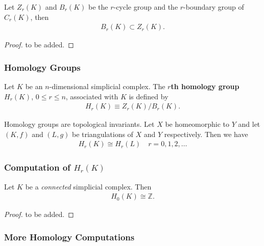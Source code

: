 \documentclass[10pt]{article}
\begin{document}
\begin{theorem}
    Let $Z_r(K)$ and $B_r(K)$ be the $r$-cycle group and the $r$-boundary group of $C_r(K)$, then
    \begin{align}
        B_r(K)\subset Z_r(K).
    \end{align}
\end{theorem}
\begin{proof}
    to be added.
\end{proof}

\subsubsection{Homology Groups}
\begin{definition}
    Let $K$ be an $n$-dimensional simplicial complex.
    The \textbf{$r$th homology group} $H_r(K)$, $0\leq r\leq n$, associated with $K$ is defined by
    \begin{align}
        H_r(K)\equiv Z_r(K)/B_r(K).
    \end{align}
\end{definition}

\begin{theorem}
    Homology groups are topological invariants.
    Let $X$ be homeomorphic to $Y$ and let $(K,f)$ and $(L,g)$ be triangulations of $X$ and $Y$ respectively.
    Then we have
    \begin{align}
        H_r(K)\cong H_r(L)\quad r=0,1,2,\dots
    \end{align}
\end{theorem}

\subsubsection{Computation of \texorpdfstring{{}$H_r(K)$}{}}
\begin{theorem}
    Let $K$ be a \textit{connected} simplicial complex.
    Then
    \begin{align}
        H_0(K)\cong\mathbb{Z}.
    \end{align}
\end{theorem}
\begin{proof}
    to be added.
\end{proof}

\subsubsection{More Homology Computations}
\end{document}
